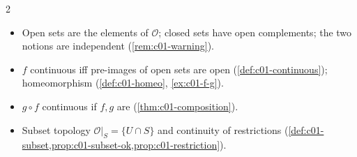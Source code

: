 \begin{paracol}{2}
\begin{keyconcepts}
\begin{itemize}
  \item Open sets are the elements of $\mathcal O$; closed sets have open complements; the two notions are independent (\cref{rem:c01-warning}).
  \item $f$ continuous iff pre-images of open sets are open (\cref{def:c01-continuous}); homeomorphism (\cref{def:c01-homeo}, \cref{ex:c01-f-g}).
  \item $g\circ f$ continuous if $f,g$ are (\cref{thm:c01-composition}).
  \item Subset topology $\mathcal O|_S=\{U\cap S\}$ and continuity of restrictions (\cref{def:c01-subset,prop:c01-subset-ok,prop:c01-restriction}).
\end{itemize}
\end{keyconcepts}

\flushside
\end{paracol}
